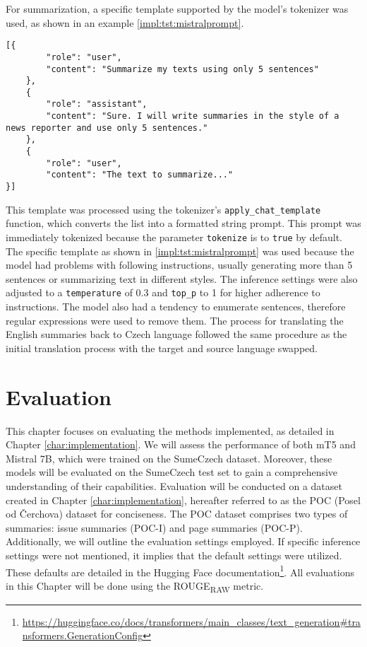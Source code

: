 \documentclass[english, ba, kiv, he, iso690numb, pdf, viewonly]{fasthesis}
\begin{document}
For summarization, a specific template supported by the model's tokenizer was used, as shown in an example \ref{impl:tst:mistralprompt}.

\lstset{style=FASThesisLstStyle,} %
\begin{lstlisting}[caption={Summarization template for TST\label{impl:tst:mistralprompt}}] 
[{
        "role": "user",
        "content": "Summarize my texts using only 5 sentences"
    },
    {
        "role": "assistant",
        "content": "Sure. I will write summaries in the style of a news reporter and use only 5 sentences."
    },
    {
        "role": "user",
        "content": "The text to summarize..."
}]    
\end{lstlisting}

This template was processed using the tokenizer's \texttt{apply\_chat\_template} function, which converts the list into a formatted string prompt. This prompt was immediately tokenized because the parameter \texttt{tokenize} is to \texttt{true} by default. The specific template as shown in \ref{impl:tst:mistralprompt} was used because the model had problems with following instructions, usually generating more than 5 sentences or summarizing text in different styles. The inference settings were also adjusted to a \texttt{temperature} of 0.3 and \texttt{top\_p} to 1 for higher adherence to instructions. The model also had a tendency to enumerate sentences, therefore regular expressions were used to remove them. The process for translating the English summaries back to Czech language followed the same procedure as the initial translation process with the target and source language swapped.

\chapter{Evaluation}\label{ch:eval}
This chapter focuses on evaluating the methods implemented, as detailed in Chapter \ref{char:implementation}. We will assess the performance of both mT5 and Mistral 7B, which were trained on the SumeCzech dataset. Moreover, these models will be evaluated on the SumeCzech test set to gain a comprehensive understanding of their capabilities. Evaluation will be conducted on a dataset created in Chapter \ref{char:implementation}, hereafter referred to as the POC (Posel od Čerchova) dataset for conciseness. The POC dataset comprises two types of summaries: issue summaries (POC-I) and page summaries (POC-P). Additionally, we will outline the evaluation settings employed. If specific inference settings were not mentioned, it implies that the default settings were utilized. These defaults are detailed in the Hugging Face documentation\footnote{\url{https://huggingface.co/docs/transformers/main_classes/text_generation\#transformers.GenerationConfig}}. All evaluations in this Chapter will be done using the ROUGE\textsubscript{RAW} metric.
\end{document}
